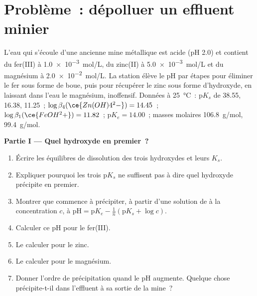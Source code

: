 \section{Problème~: dépolluer un effluent minier}

\begin{problem}
\label{pb:b1:precipitation:1}
L'eau qui s'écoule d'une ancienne mine métallique est acide (pH 2.0) et
contient du fer(III) à \qty{1.0e-3}{mol/L}, du zinc(II) à
\qty{5.0e-3}{mol/L} et du magnésium à \qty{2.0e-2}{mol/L}. La station
élève le pH par étapes pour éliminer le fer sous forme de boue, puis
pour récupérer le zinc sous forme d'hydroxyde, en laissant dans l'eau le
magnésium, inoffensif. Données à \qty{25}{\celsius}~: $\mathrm{p}K_s$ de
 38.55, 
16.38,  11.25~; $\log\beta_4(\ce{Zn(OH)4^2-}) = 14.45$~;
$\log\beta_1(\ce{FeOH^2+}) = 11.82$~; $\mathrm{p}K_e = 14.00$~; masses
molaires  \qty{106.8}{g/mol},  \qty{99.4}{g/mol}.

\medskip
\noindent\textbf{Partie I --- Quel hydroxyde en premier~?}
\begin{enumerate}
  \item Écrire les équilibres de dissolution des trois hydroxydes et
        leurs $K_s$.
  \item Expliquer pourquoi les trois $\mathrm{p}K_s$ ne suffisent pas à
        dire quel hydroxyde précipite en premier.
  \item Montrer que  commence à précipiter, à partir d'une
        solution de  à la concentration $c$, à
        $\mathrm{pH} = \mathrm{p}K_e -
        \frac1n(\mathrm{p}K_s + \log c)$.
  \item Calculer ce pH pour le fer(III).
  \item Le calculer pour le zinc.
  \item Le calculer pour le magnésium.
  \item Donner l'ordre de précipitation quand le pH augmente. Quelque
        chose précipite-t-il dans l'effluent à sa sortie de la mine~?
\end{enumerate}


\end{problem}

